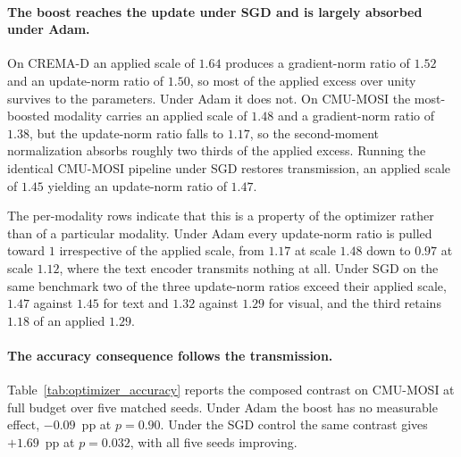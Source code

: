 \documentclass{article}
\begin{document}
\paragraph{The boost reaches the update under SGD and is largely absorbed under Adam.} On CREMA-D an applied scale of $1.64$ produces a gradient-norm ratio of $1.52$ and an update-norm ratio of $1.50$, so most of the applied excess over unity survives to the parameters. Under Adam it does not. On CMU-MOSI the most-boosted modality carries an applied scale of $1.48$ and a gradient-norm ratio of $1.38$, but the update-norm ratio falls to $1.17$, so the second-moment normalization absorbs roughly two thirds of the applied excess. Running the identical CMU-MOSI pipeline under SGD restores transmission, an applied scale of $1.45$ yielding an update-norm ratio of $1.47$.

The per-modality rows indicate that this is a property of the optimizer rather than of a particular modality. Under Adam every update-norm ratio is pulled toward $1$ irrespective of the applied scale, from $1.17$ at scale $1.48$ down to $0.97$ at scale $1.12$, where the text encoder transmits nothing at all. Under SGD on the same benchmark two of the three update-norm ratios exceed their applied scale, $1.47$ against $1.45$ for text and $1.32$ against $1.29$ for visual, and the third retains $1.18$ of an applied $1.29$.

\paragraph{The accuracy consequence follows the transmission.} Table~\ref{tab:optimizer_accuracy} reports the composed contrast on CMU-MOSI at full budget over five matched seeds. Under Adam the boost has no measurable effect, $-0.09$~pp at $p = 0.90$. Under the SGD control the same contrast gives $+1.69$~pp at $p = 0.032$, with all five seeds improving.
\end{document}
